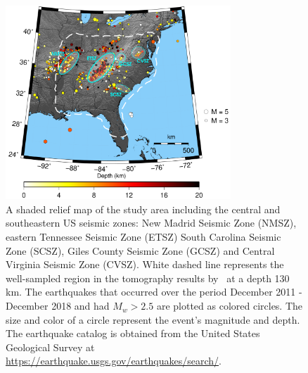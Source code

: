 \documentclass[draft,linenumbers]{agujournal2018}
\begin{document}

\begin{figure}[ht]
    \centering
    \includegraphics[width=20pc]{figures/seismicity_new.png}
    \caption{ A shaded relief map of the study area including the central and southeastern US seismic zones: New Madrid Seismic Zone (NMSZ), eastern Tennessee  Seismic Zone (ETSZ) South Carolina Seismic Zone (SCSZ), Giles County Seismic Zone (GCSZ) and Central Virginia Seismic Zone (CVSZ). White dashed line represents the well-sampled region in the tomography results by~\citet{Biryol_2016} at a depth 130 km. The earthquakes that occurred over the period December 2011 - December 2018 and had $M_{w} > 2.5$ are plotted as colored circles. The size and color of a circle represent the event's magnitude and depth. The earthquake catalog is obtained from the United States Geological Survey at \url{https://earthquake.usgs.gov/earthquakes/search/}.}
    \label{figone}
 \end{figure}
   
    
\end{document}
